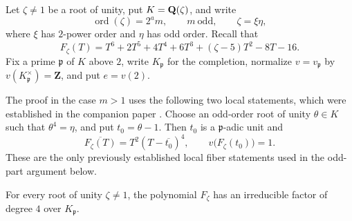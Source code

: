 Let $\zeta\ne1$ be a root of unity, put $K=\mathbf Q(\zeta)$, and write
\[
 \operatorname{ord}(\zeta)=2^a m,
 \qquad m\ \text{odd},
 \qquad \zeta=\xi\eta,
\]
where $\xi$ has $2$-power order and $\eta$ has odd order.  Recall that
\[
 F_\zeta(T)
 =T^6+2T^5+4T^4+6T^3+(\zeta-5)T^2-8T-16.
\]
Fix a prime $\mathfrak p$ of $K$ above $2$, write
$K_{\mathfrak p}$ for the completion, normalize
$v=v_{\mathfrak p}$ by $v(K_{\mathfrak p}^\times)=\mathbf Z$, and put
$e=v(2)$.

The proof in the case $m>1$ uses the following two local statements,
which were established in the companion paper \cite{WeiPeriod4}.  Choose
an odd-order root of unity $\theta\in K$ such that $\theta^4=\eta$, and
put $t_0=\theta-1$.  Then $t_0$ is a $\mathfrak p$-adic unit and
\begin{equation}
 \overline{F_\zeta(T)}=T^2(T-\overline{t_0})^4,
 \qquad
 v\bigl(F_\zeta(t_0)\bigr)=1.
 \label{eq:quartic-established-odd-data}
\end{equation}
These are the only previously established local fiber statements used
in the odd-part argument below.

\begin{proposition}
\label{prop:local-quartic-factor}
For every root of unity $\zeta\ne1$, the polynomial $F_\zeta$ has an
irreducible factor of degree $4$ over $K_{\mathfrak p}$.
\end{proposition}

